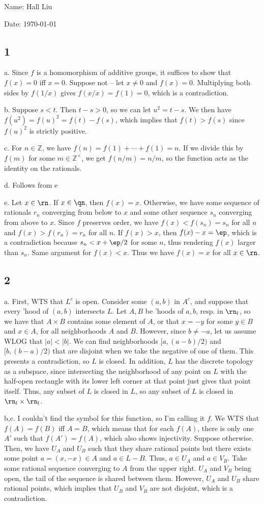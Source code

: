 \documentclass{article}
\begin{document}
Name: Hall Liu

Date: \today 
\subsection*{1}
a. Since $f$ is a homomorphism of additive groups, it suffices to show that $f(x)=0$ iff $x=0$. Suppose not -- let $x\neq0$ and $f(x)=0$. Multiplying both sides by $f(1/x)$ gives $f(x/x)=f(1)=0$, which is a contradiction.

b. Suppose $s<t$. Then $t-s>0$, so we can let $u^2=t-s$. We then have $f(u^2)=f(u)^2=f(t)-f(s)$, which implies that $f(t)>f(s)$ since $f(u)^2$ is strictly positive.

c. For $n\in\mathbb{Z}$, we have $f(n)=f(1)+\cdots+f(1)=n$. If we divide this by $f(m)$ for some $m\in\mathbb{Z}^\times$, we get $f(n/m)=n/m$, so the function acts as the identity on the rationals.

d. Follows from e

e. Let $x\in\rn$. If $x\in\qn$, then $f(x)=x$. Otherwise, we have some sequence of rationals $r_n$ converging from below to $x$ and some other sequence $s_n$ converging from above to $x$. Since $f$ preserves order, we have $f(x)<f(s_n)=s_n$ for all $n$ and $f(x)>f(r_n)=r_n$ for all $n$. If $f(x)>x$, then $f(x)-x=\ep$, which is a contradiction because $s_n<x+\ep/2$ for some $n$, thus rendering $f(x)$ larger than $s_n$. Same argument for $f(x)<x$. Thus we have $f(x)=x$ for all $x\in\rn$.
\subsection*{2}
a. First, WTS that $L^c$ is open. Consider some $(a,b)$ in $A^c$, and suppose that every 'hood of $(a,b)$ intersects $L$. Let $A,B$ be 'hoods of $a,b$, resp. in $\rn_l$, so we have that $A\times B$ contains some element of $A$, or that $x=-y$ for some $y\in B$ and $x\in A$, for all neighborhoods $A$ and $B$. However, since $b\neq -a$, let us assume WLOG that $|a|<|b|$. We can find neighborhoods $[a,(a-b)/2)$ and $[b,(b-a)/2)$ that are disjoint when we take the negative of one of them. This presents a contradiction, so $L$ is closed. In addition, $L$ has the discrete topology as a subspace, since intersecting the neighborhood of any point on $L$ with the half-open rectangle with its lower left corner at that point just gives that point itself. Thus, any subset of $L$ is closed in $L$, so any subset of $L$ is closed in $\rn_l\times\rn_l$.

b,c. I couldn't find the symbol for this function, so I'm calling it $f$. We WTS that $f(A)=f(B)$ iff $A=B$, which means that for each $f(A)$, there is only one $A'$ such that $f(A')=f(A)$, which also shows injectivity. Suppose otherwise. Then, we have $U_A$ and $U_B$ such that they share rational points but there exists some point $a=(x,-x)\in A$ and $a\in L-B$. Thus, $a\in U_A$ and $a\in V_B$. Take some rational sequence converging to $A$ from the upper right. $U_A$ and $V_B$ being open, the tail of the sequence is shared between them. However, $U_A$ and $U_B$ share rational points, which implies that $U_B$ and $V_B$ are not disjoint, which is a contradiction. 
\end{document}
